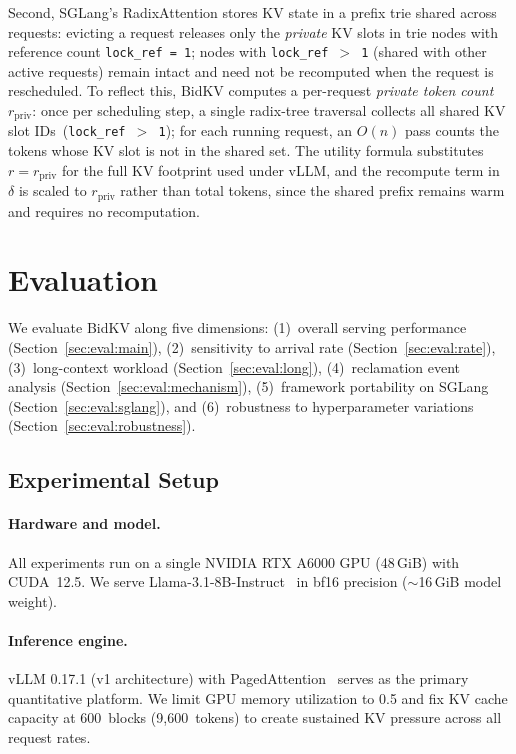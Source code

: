 \documentclass[sigconf,nonacm]{acmart}
\newcommand{\bidkv}{BidKV\xspace}
\newcommand{\tokfree}{\ensuremath{r}}
\newcommand{\qualdelta}{\ensuremath{\delta}}
\begin{document}
Second, SGLang's RadixAttention stores KV state in a prefix trie shared
across requests: evicting a request releases only the \emph{private} KV
slots in trie nodes with reference count \texttt{lock\_ref\,=\,1};
nodes with \texttt{lock\_ref\,$>$\,1} (shared with other active requests)
remain intact and need not be recomputed when the request is rescheduled.
To reflect this, \bidkv computes a per-request \emph{private token count}
$r_{\mathrm{priv}}$: once per scheduling step, a single radix-tree
traversal collects all shared KV slot IDs~(\texttt{lock\_ref\,$>$\,1});
for each running request, an $O(n)$ pass counts the tokens whose KV slot
is not in the shared set.  The utility formula substitutes
$\tokfree = r_{\mathrm{priv}}$ for the full KV footprint used under
vLLM, and the recompute term in~$\qualdelta$ is scaled to
$r_{\mathrm{priv}}$ rather than total tokens, since the shared prefix
remains warm and requires no recomputation.

\section{Evaluation}\label{sec:eval}

We evaluate \bidkv along five dimensions: (1)~overall serving performance
(Section~\ref{sec:eval:main}), (2)~sensitivity to arrival rate
(Section~\ref{sec:eval:rate}), (3)~long-context workload
(Section~\ref{sec:eval:long}), (4)~reclamation event analysis
(Section~\ref{sec:eval:mechanism}), (5)~framework portability on SGLang
(Section~\ref{sec:eval:sglang}), and (6)~robustness to hyperparameter variations
(Section~\ref{sec:eval:robustness}).

\subsection{Experimental Setup}\label{sec:eval:setup}

\paragraph{Hardware and model.}
All experiments run on a single NVIDIA RTX A6000 GPU (48\,GiB) with CUDA~12.5.
We serve Llama-3.1-8B-Instruct~\cite{Grattafiori2024} in bf16 precision
($\sim$16\,GiB model weight).

\paragraph{Inference engine.}
vLLM 0.17.1 (v1 architecture) with PagedAttention~\cite{Kwon2023} serves as the
primary quantitative platform.  We limit GPU memory utilization to 0.5 and fix
KV cache capacity at 600~blocks (9{,}600~tokens) to create sustained KV
pressure across all request rates.
\end{document}
